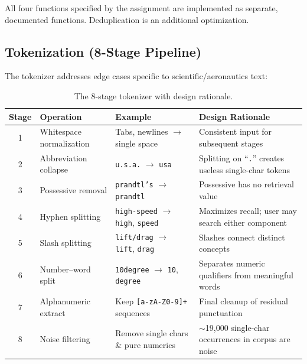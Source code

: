 \documentclass[12pt,a4paper]{article}
\begin{document}
All four functions specified by the assignment are implemented as separate, documented functions.  Deduplication is an additional optimization.

\subsection{Tokenization (8-Stage Pipeline)}
\label{sec:tokenization}

The tokenizer addresses edge cases specific to scientific/aeronautics text:

\begin{table}[H]
\centering\small
\caption{The 8-stage tokenizer with design rationale.}
\label{tab:tokenization}
\begin{tabular}{@{}c p{3.2cm} p{3.5cm} p{4.5cm}@{}}
\toprule
\textbf{Stage} & \textbf{Operation} & \textbf{Example} & \textbf{Design Rationale} \\
\midrule
1 & Whitespace normalization & Tabs, newlines $\to$ single space & Consistent input for subsequent stages \\
2 & Abbreviation collapse & \texttt{u.s.a.} $\to$ \texttt{usa} & Splitting on ``\texttt{.}'' creates useless single-char tokens \\
3 & Possessive removal & \texttt{prandtl's} $\to$ \texttt{prandtl} & Possessive has no retrieval value \\
4 & Hyphen splitting & \texttt{high-speed} $\to$ \texttt{high}, \texttt{speed} & Maximizes recall; user may search either component \\
5 & Slash splitting & \texttt{lift/drag} $\to$ \texttt{lift}, \texttt{drag} & Slashes connect distinct concepts \\
6 & Number--word split & \texttt{10degree} $\to$ \texttt{10}, \texttt{degree} & Separates numeric qualifiers from meaningful words \\
7 & Alphanumeric extract & Keep \texttt{[a-zA-Z0-9]+} sequences & Final cleanup of residual punctuation \\
8 & Noise filtering & Remove single chars \& pure numerics & $\sim$19,000 single-char occurrences in corpus are noise \\
\bottomrule
\end{tabular}
\end{table}
\end{document}
